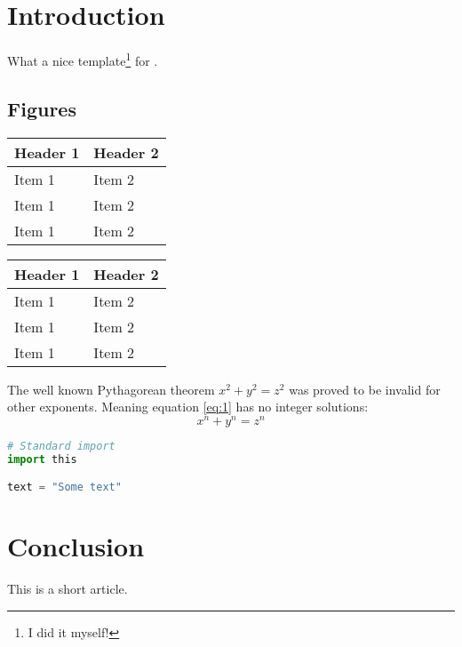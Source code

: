 \section*{Introduction}

What a nice template\footnote{I did it myself!} for \citep{Rougier:2017}.

\subsection*{Figures}
\begin{figure}[htbp]
    \label{fig:1}
\end{figure}

\begin{table}[htbp]
\begin{minipage}{.45\textwidth}
  \begin{tabularx}{\textwidth}{|XX|}
      \hline
      \bfseries Header 1 & \bfseries Header 2\\
      \hline
      Item 1 & Item 2\\
      Item 1 & Item 2\\
      Item 1 & Item 2\\
      \hline
    \end{tabularx}
    \label{tab:1}
\end{minipage}
\hfill
\begin{minipage}{.45\textwidth}
  \begin{tabularx}{\textwidth}{|XX|}
      \hline
      \bfseries Header 1 & \bfseries Header 2\\
      \hline
      Item 1 & Item 2\\
      Item 1 & Item 2\\
      Item 1 & Item 2\\
      \hline
    \end{tabularx}
    \label{tab:2}
\end{minipage}
\end{table}


The well known Pythagorean theorem \(x^2 + y^2 = z^2\) was proved to be invalid
for other exponents.  Meaning equation \eqref{eq:1} has no integer solutions:
\begin{equation}
  \label{eq:1}
  x^n + y^n = z^n
\end{equation}


\begin{lstlisting}[language=python, caption={Listing caption}, label={lst:1}]
# Standard import
import this

text = "Some text"
\end{lstlisting}


\section*{Conclusion}

This is a short article.
